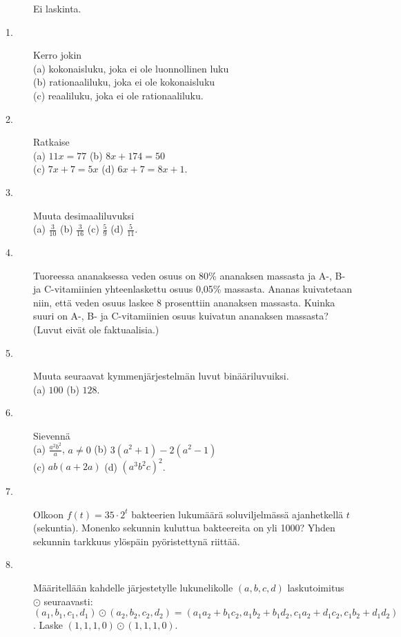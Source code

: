\begin{description}
	\item[] Ei laskinta.
	\item[1.] Kerro jokin \\
	(a) kokonaisluku, joka ei ole luonnollinen luku \\
	(b) rationaaliluku, joka ei ole kokonaisluku \\
	(c) reaaliluku, joka ei ole rationaaliluku.
	\item[2.] Ratkaise \\
	(a) $11x=77$ \qquad
	(b) $8x+174=50$ \\
	(c) $7x+7=5x$ \qquad
	(d) $6x+7=8x+1$.
	\item[3.] Muuta desimaaliluvuksi \\
	(a) $\frac{3}{10}$ \qquad
	(b) $\frac{3}{16}$ \qquad
	(c) $\frac{5}{9}$ \qquad
	(d) $\frac{5}{11}$.
	\item[4.] Tuoreessa ananaksessa veden osuus on 80\% ananaksen massasta ja A-, B- ja C-vitamiinien yhteenlaskettu osuus 0,05\% massasta. Ananas kuivatetaan niin, että veden osuus laskee 8 prosenttiin ananaksen massasta. Kuinka suuri on A-, B- ja C-vitamiinien osuus kuivatun ananaksen massasta? (Luvut eivät ole faktuaalisia.)
	\item[5.] Muuta seuraavat kymmenjärjestelmän luvut binääriluvuiksi. \\
	(a) $100$ \qquad
	(b) $128$.
	\item[6.] Sievennä \\
	(a) $\frac{a^2 b^2}{a}$, $a \neq 0$ \qquad
	(b) $3(a^2+1)-2(a^2-1)$ \\
	(c) $ab(a+2a)$ \qquad
	(d) $(a^3 b^2 c)^2$.
	\item[7.] Olkoon $f(t) = 35 \cdot 2^t$ bakteerien lukumäärä soluviljelmässä ajanhetkellä $t$ (sekuntia). Monenko sekunnin kuluttua bakteereita on yli 1000? Yhden sekunnin tarkkuus ylöspäin pyöristettynä riittää.
	\item[8.] Määritellään kahdelle järjestetylle lukunelikolle $(a, b, c, d)$ laskutoimitus $\odot$ seuraavasti: $(a_1, b_1, c_1, d_1) \odot (a_2, b_2, c_2, d_2) = (a_1 a_2 + b_1 c_2, a_1 b_2 + b_1 d_2, c_1 a_2 + d_1 c_2, c_1 b_2 + d_1 d_2)$. Laske $(1, 1, 1, 0) \odot (1, 1, 1, 0)$.

\end{description}
